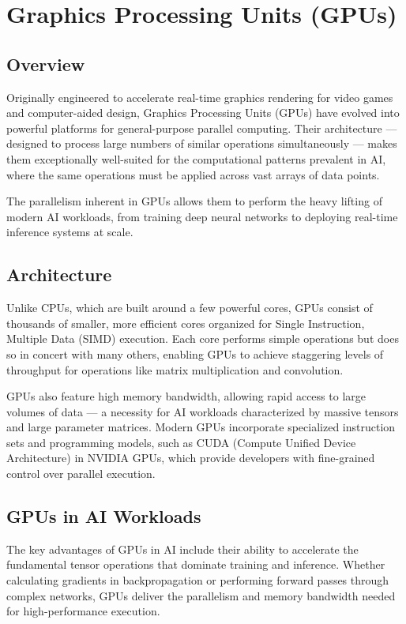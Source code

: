 \documentclass[openany]{book}
\begin{document}
\section{Graphics Processing Units (GPUs)}

\subsection{Overview}
Originally engineered to accelerate real-time graphics rendering for video games 
and computer-aided design, Graphics Processing Units (GPUs) have evolved into 
powerful platforms for general-purpose parallel computing. Their architecture — 
designed to process large numbers of similar operations simultaneously — makes 
them exceptionally well-suited for the computational patterns prevalent in AI, 
where the same operations must be applied across vast arrays of data points.

The parallelism inherent in GPUs allows them to perform the heavy lifting of 
modern AI workloads, from training deep neural networks to deploying real-time 
inference systems at scale.

\subsection{Architecture}
Unlike CPUs, which are built around a few powerful cores, GPUs consist of 
thousands of smaller, more efficient cores organized for Single Instruction, 
Multiple Data (SIMD) execution. Each core performs simple operations but does 
so in concert with many others, enabling GPUs to achieve staggering levels of 
throughput for operations like matrix multiplication and convolution.

GPUs also feature high memory bandwidth, allowing rapid access to large volumes 
of data — a necessity for AI workloads characterized by massive tensors and 
large parameter matrices. Modern GPUs incorporate specialized instruction sets 
and programming models, such as CUDA (Compute Unified Device Architecture) in 
NVIDIA GPUs, which provide developers with fine-grained control over parallel 
execution.

\subsection{GPUs in AI Workloads}
The key advantages of GPUs in AI include their ability to accelerate the 
fundamental tensor operations that dominate training and inference. Whether 
calculating gradients in backpropagation or performing forward passes through 
complex networks, GPUs deliver the parallelism and memory bandwidth needed for 
high-performance execution.
\end{document}

